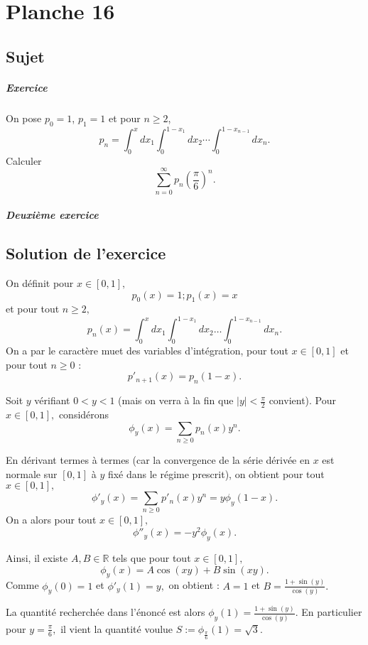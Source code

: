 \chapter{Planche 16}

\section{Sujet}

\paragraph{Exercice}
On pose $p_{0}=1$, $p_{1} = 1$ et pour $n\geqslant 2$,
\[
p_{n}=\int_{0}^{x}dx_{1}\int_{0}^{1-x_{1}}dx_{2}\cdots\int_{0}^{1-x_{n-1}}dx_{n}.
\]
Calculer
\[
\sum_{n=0}^\infty p_n \left(\frac\pi6\right)^n.
\]

\paragraph{Deuxième exercice}

\section{Solution de l'exercice}

On définit pour $x\in[0,1],$ $$p_{0}(x)=1;p_{1}(x)=x$$et pour tout $n\geq 2,$ $$p_{n}(x)=\int_{0}^{x}dx_{1}\int_{0}^{1-x_{1}}dx_{2}\ldots\int_{0}^{1-x_{n-1}}dx_{n}.$$
On a par le caractère muet des variables d'intégration, pour tout $x\in[0,1]$ et pour tout $n\geq 0$ : $$p'_{n+1}(x)=p_{n}(1-x).$$

Soit $y$ vérifiant $0<y<1$ (mais on verra à la fin que $\vert y\vert <\frac{\pi}{2}$ convient).
Pour $x\in[0,1],$ considérons $$\phi_{y}(x)=\sum_{n\geq 0}p_{n}(x)y^{n}.$$

En dérivant termes à termes (car la convergence de la série dérivée en $x$ est normale sur $[0,1]$ à $y$ fixé dans le régime prescrit), 
on obtient pour tout $x\in[0,1],$ $$\phi'_{y}(x)=\sum_{n\geq 0}p'_{n}(x)y^{n}=y\phi_{y}(1-x).$$
On a alors pour tout $x\in[0,1],$ $$ \phi''_{y}(x)=-y^{2}\phi_{y}(x).$$

Ainsi, il existe $A,B\in\mathbb{R}$ tels que pour tout $x\in[0,1],$ $$ \phi_{y}(x)=A\cos(xy)+B\sin(xy).$$
Comme $\phi_{y}(0)=1$ et $\phi'_{y}(1)=y,$ on obtient : $A=1$ et $\displaystyle B=\frac{1+\sin(y)}{\cos(y)}.$

La quantité recherchée dans l'énoncé est alors $\displaystyle \phi_{y}(1)=\frac{1+\sin(y)}{\cos(y)}.$
En particulier pour $\displaystyle y=\frac{\pi}{6},$ il vient la quantité voulue $\displaystyle S:=\phi_{\frac{\pi}{6}}(1)=\sqrt{3}.$
